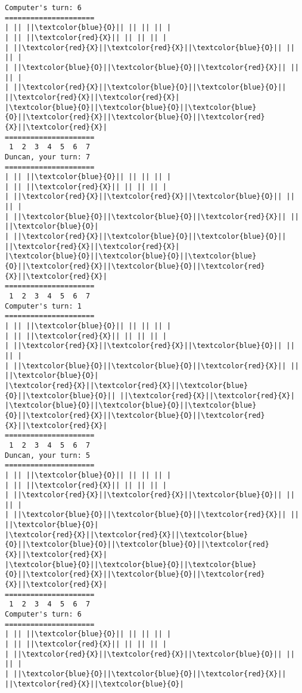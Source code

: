 \documentclass{article}
\begin{document}
\begin{Verbatim}[commandchars=\\\{\}]
Computer's turn: 6
=====================
| || ||\textcolor{blue}{O}|| || || || |
| || ||\textcolor{red}{X}|| || || || |
| ||\textcolor{red}{X}||\textcolor{red}{X}||\textcolor{blue}{O}|| || || |
| ||\textcolor{blue}{O}||\textcolor{blue}{O}||\textcolor{red}{X}|| || || |
| ||\textcolor{red}{X}||\textcolor{blue}{O}||\textcolor{blue}{O}|| ||\textcolor{red}{X}||\textcolor{red}{X}|
|\textcolor{blue}{O}||\textcolor{blue}{O}||\textcolor{blue}{O}||\textcolor{red}{X}||\textcolor{blue}{O}||\textcolor{red}{X}||\textcolor{red}{X}|
=====================
 1  2  3  4  5  6  7
Duncan, your turn: 7
=====================
| || ||\textcolor{blue}{O}|| || || || |
| || ||\textcolor{red}{X}|| || || || |
| ||\textcolor{red}{X}||\textcolor{red}{X}||\textcolor{blue}{O}|| || || |
| ||\textcolor{blue}{O}||\textcolor{blue}{O}||\textcolor{red}{X}|| || ||\textcolor{blue}{O}|
| ||\textcolor{red}{X}||\textcolor{blue}{O}||\textcolor{blue}{O}|| ||\textcolor{red}{X}||\textcolor{red}{X}|
|\textcolor{blue}{O}||\textcolor{blue}{O}||\textcolor{blue}{O}||\textcolor{red}{X}||\textcolor{blue}{O}||\textcolor{red}{X}||\textcolor{red}{X}|
=====================
 1  2  3  4  5  6  7
Computer's turn: 1
=====================
| || ||\textcolor{blue}{O}|| || || || |
| || ||\textcolor{red}{X}|| || || || |
| ||\textcolor{red}{X}||\textcolor{red}{X}||\textcolor{blue}{O}|| || || |
| ||\textcolor{blue}{O}||\textcolor{blue}{O}||\textcolor{red}{X}|| || ||\textcolor{blue}{O}|
|\textcolor{red}{X}||\textcolor{red}{X}||\textcolor{blue}{O}||\textcolor{blue}{O}|| ||\textcolor{red}{X}||\textcolor{red}{X}|
|\textcolor{blue}{O}||\textcolor{blue}{O}||\textcolor{blue}{O}||\textcolor{red}{X}||\textcolor{blue}{O}||\textcolor{red}{X}||\textcolor{red}{X}|
=====================
 1  2  3  4  5  6  7
Duncan, your turn: 5
=====================
| || ||\textcolor{blue}{O}|| || || || |
| || ||\textcolor{red}{X}|| || || || |
| ||\textcolor{red}{X}||\textcolor{red}{X}||\textcolor{blue}{O}|| || || |
| ||\textcolor{blue}{O}||\textcolor{blue}{O}||\textcolor{red}{X}|| || ||\textcolor{blue}{O}|
|\textcolor{red}{X}||\textcolor{red}{X}||\textcolor{blue}{O}||\textcolor{blue}{O}||\textcolor{blue}{O}||\textcolor{red}{X}||\textcolor{red}{X}|
|\textcolor{blue}{O}||\textcolor{blue}{O}||\textcolor{blue}{O}||\textcolor{red}{X}||\textcolor{blue}{O}||\textcolor{red}{X}||\textcolor{red}{X}|
=====================
 1  2  3  4  5  6  7
Computer's turn: 6
=====================
| || ||\textcolor{blue}{O}|| || || || |
| || ||\textcolor{red}{X}|| || || || |
| ||\textcolor{red}{X}||\textcolor{red}{X}||\textcolor{blue}{O}|| || || |
| ||\textcolor{blue}{O}||\textcolor{blue}{O}||\textcolor{red}{X}|| ||\textcolor{red}{X}||\textcolor{blue}{O}|

\end{Verbatim}
\end{document}
